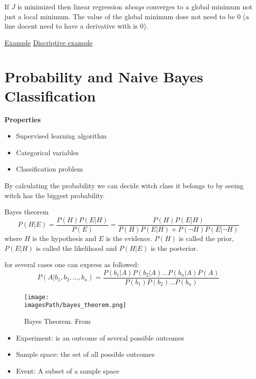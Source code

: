 If $J$ is minimized then linear regression \textit{always} converges to a global minimum not just a local minimum.
The value of the global minimum dose not need to be $0$ (a line docent need to have a derivative with is $0$).

\href{https://www.youtube.com/watch?v=ErpIw2ohNMs}{Example}
\href{https://machinelearningmastery.com/linear-regression-tutorial-using-gradient-descent-for-machine-learning/}{Discriptive example}


\section{Probability and Naive Bayes Classification}
\textbf{Properties}
\begin{itemize}
    \item Supervised learning algorithm
    \item Categorical variables 
    \item Classification problem
\end{itemize}

By calculating the probability we can decide witch class it belongs to by seeing witch 
has the biggest probability.

\begin{definitionblock}{Bayes theorem}
    \begin{equation*}
        P(H|E) = \frac{P(H)P(E|H)}{P(E)} = \frac{P(H)P(E|H)}{P(H)P(E|H) + P(\neg H)P(E|\neg H)}
    \end{equation*}
    where $H$ is the hypothesis and $E$ is the evidence. $P(H)$ is called the prior, $P(E|H)$ is called the likelihood
    and $P(H|E)$ is the posterior.

\end{definitionblock}

for several cases one can express as followed:
\begin{equation*}
    P(A|b_1,b_2,...,b_n) = \frac{P(b_1|A)P(b_2|A)...P(b_n|A)P(A)}{P(b_1)P(b_2)...P(b_n)}
\end{equation*}

\begin{figure}[!h]
    \centering
    \texttt{[image: \\imagesPath/bayes\_theorem.png]}
    \caption{Bayes Theorem. From \cite{}}
\end{figure}

\begin{itemize}
    \item Experiment: is an outcome of several possible outcomes
    \item Sample space: the set of all possible outcomes
    \item Event: A subset of a sample space
\end{itemize}


